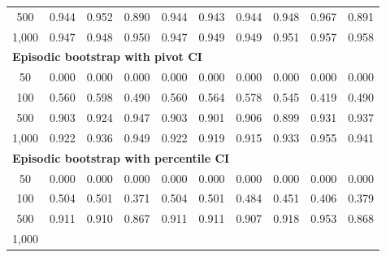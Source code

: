 \documentclass{article}
\numberwithin{equation}{section}
\begin{document}
\begin{table}[ht]
\begin{tabular}{c|ccc|cccccc}
500
& \cellcolor{covheat!97!white}0.944 & \cellcolor{covheat!100!white}0.952 & \cellcolor{covheat!70!white}0.890
& \cellcolor{covheat!97!white}0.944 & \cellcolor{covheat!96!white}0.943 & \cellcolor{covheat!97!white}0.944 & \cellcolor{covheat!99!white}0.948 & \cellcolor{covheat!100!white}0.967 & \cellcolor{covheat!71!white}0.891 \\
1{,}000
& \cellcolor{covheat!98!white}0.947 & \cellcolor{covheat!99!white}0.948 & \cellcolor{covheat!100!white}0.950
& \cellcolor{covheat!98!white}0.947 & \cellcolor{covheat!100!white}0.949 & \cellcolor{covheat!100!white}0.949 & \cellcolor{covheat!100!white}0.951 & \cellcolor{covheat!100!white}0.957 & \cellcolor{covheat!100!white}0.958 \\
\hline
\multicolumn{10}{l}{\textbf{Episodic bootstrap with pivot CI}} \\ \hline
50
& 0.000 & 0.000 & 0.000
& 0.000 & 0.000 & 0.000 & 0.000 & 0.000 & 0.000 \\
100
& 0.560 & 0.598 & 0.490
& 0.560 & 0.564 & 0.578 & 0.545 & 0.419 & 0.490 \\
500
& \cellcolor{covheat!77!white}0.903 & \cellcolor{covheat!87!white}0.924 & \cellcolor{covheat!98!white}0.947
& \cellcolor{covheat!77!white}0.903 & \cellcolor{covheat!76!white}0.901 & \cellcolor{covheat!78!white}0.906 & \cellcolor{covheat!75!white}0.899 & \cellcolor{covheat!91!white}0.931 & \cellcolor{covheat!94!white}0.937 \\
1{,}000
& \cellcolor{covheat!86!white}0.922 & \cellcolor{covheat!93!white}0.936 & \cellcolor{covheat!100!white}0.949
& \cellcolor{covheat!86!white}0.922 & \cellcolor{covheat!85!white}0.919 & \cellcolor{covheat!83!white}0.915 & \cellcolor{covheat!92!white}0.933 & \cellcolor{covheat!100!white}0.955 & \cellcolor{covheat!96!white}0.941 \\
\hline
\multicolumn{10}{l}{\textbf{Episodic bootstrap with percentile CI}} \\ \hline
50
& 0.000 & 0.000 & 0.000
& 0.000 & 0.000 & 0.000 & 0.000 & 0.000 & 0.000 \\
100
& 0.504 & 0.501 & 0.371
& 0.504 & 0.501 & 0.484 & 0.451 & 0.406 & 0.379 \\
500
& \cellcolor{covheat!81!white}0.911 & \cellcolor{covheat!80!white}0.910 & \cellcolor{covheat!59!white}0.867
& \cellcolor{covheat!81!white}0.911 & \cellcolor{covheat!81!white}0.911 & \cellcolor{covheat!79!white}0.907 & \cellcolor{covheat!84!white}0.918 & \cellcolor{covheat!100!white}0.953 & \cellcolor{covheat!59!white}0.868 \\
1{,}000

\end{tabular}
\end{table}
\end{document}
